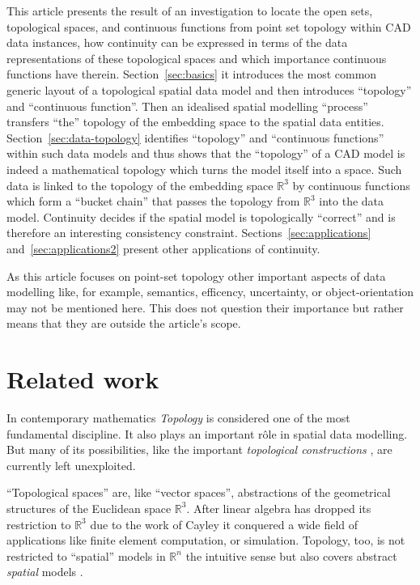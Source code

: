 \documentclass[5p]{elsarticle}
\newcommand{\qq}[1]{``#1''}
\begin{document}
This article presents the result of an investigation to locate the open sets, topological 
spaces, and continuous functions from point set topology within CAD data instances, how 
continuity can be expressed in terms of the data representations of these topological spaces 
and which importance continuous functions have therein. 
Section~\ref{sec:basics} it introduces the most common 
generic layout of a topological spatial data model and then introduces \qq{topology} and 
\qq{continuous function}. Then an idealised spatial modelling \qq{process} 
transfers \qq{the} topology of the embedding space to the spatial data entities.  
Section~\ref{sec:data-topology} identifies \qq{topology} and \qq{continuous functions} 
within such data models and thus shows that the \qq{topology} of a 
CAD model is indeed a mathematical topology which turns the model itself into a 
space. Such data is linked to the topology of the embedding space $\mathbb{R}^3$ by 
continuous functions which form a \qq{bucket chain} that passes the topology 
from $\mathbb{R}^3$  into the data model. 
Continuity decides if the spatial model is topologically \qq{correct} and is therefore 
an interesting consistency constraint. 
Sections~\ref{sec:applications} and~\ref{sec:applications2} present other applications 
of continuity. 




As this article focuses on point-set topology other important aspects of data modelling like, 
for example, semantics, efficency, uncertainty, or object-orientation may not be mentioned here. 
This does not question their importance but rather means that they are outside the article's 
scope. 

\section{Related work}

In contemporary mathematics \emph{Topology} is considered one of the most fundamental discipline. 
It also plays an important r\^ole in spatial data modelling. But many of its possibilities, 
like the important \emph{topological constructions} \cite[Ch.\ IV]{Viro:Textbook},
are currently left unexploited. 

\qq{Topological spaces} are, like \qq{vector spaces}, abstractions of the 
geometrical structures of the Euclidean space $\mathbb{R}^3$. 
After linear algebra has dropped its restriction to $\mathbb{R}^3$ due to the work of 
Cayley \cite{Tait:Obituary} it conquered a wide field of applications like 
finite element computation, or simulation. 
Topology, too, is not restricted to \qq{spatial} models in $\mathbb{R}^n$ the intuitive 
sense but also covers abstract \emph{spatial} models \cite{BrahaReich:Design}. 
\end{document}
